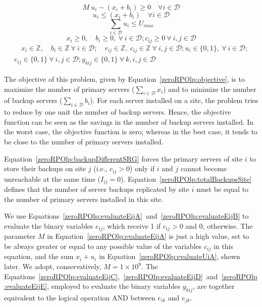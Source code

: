 \documentclass[preprint]{elsarticle}
\begin{document}
\begin{equation}
M \ u_i - (x_i + b_i) \geq 0 \quad \forall i \in \mathcal{D}
\label{zeroRPOlp:evaluateUiA}
\end{equation}
\begin{equation}
u_i \leq (x_i + b_i) \quad \forall i \in \mathcal{D}
\label{zeroRPOlp:evaluateUiB}
\end{equation}
\begin{equation}
\sum_{i \in \mathcal{D}} u_i \leq U_{max}
\label{zeroRPOlp:maxNrSites}
\end{equation}
\begin{equation}
x_i \geq 0, \quad b_i \geq 0, \ \forall \ i \in \mathcal{D} ; c_{ij} \geq 0 \ \forall \ i,j \in \mathcal{D}
\label{zeroRPOlp:boundsA}
\end{equation}
\begin{equation}
\begin{split}
\quad x_i \in \mathbb{Z}, \quad b_i \in \mathbb{Z} \ \forall \ i \in \mathcal{D}; \quad r_{ij} \in \mathbb{Z}, \ c_{ij} \in \mathbb{Z} \ \forall \ i,j \in \mathcal{D}; u_i \in \{0,1\},  \ \forall \ i \in \mathcal{D}; \\
 e_{ij} \in \{0,1\} \ \forall \ i,j \in \mathcal{D}; y_{kij} \in \{0,1\} \ \forall \ k,i,j \in \mathcal{D}
\end{split}
\label{zeroRPOlp:domain}
\end{equation}

The objective of this problem, given by Equation~\ref{zeroRPOlp:objective}, is to maximize the number of primary servers ($\sum_{i \in \mathcal{D}} x_i$) and to minimize the number of backup servers ($\sum_{i \in \mathcal{D}} b_i$). For each server installed on a site, the problem tries to reduce by one unit the number of backup servers. Hence, the objective function can be seen as the savings in the number of backup servers installed. In the worst case, the objective function is zero; whereas in the best case, it tends to be close to the number of primary servers installed.

Equation~\ref{zeroRPOlp:backupDifferentSRG} forces the primary servers of site $i$ to store their backups on site $j$ (i.e., $c_{ij} > 0$) only if $i$ and $j$ cannot become unreachable at the same time ($I_{ij} = 0$). 
Equation~\ref{zeroRPOlp:totalBackupsSite} defines that the number of server backups replicated by site $i$ must be equal to the number of primary servers installed in this site.

We use Equations~\ref{zeroRPOlp:evaluateEijA}~and~\ref{zeroRPOlp:evaluateEijB} to evaluate the binary variables $e_{ij}$, which receive 1 if $c_{ij} > 0$ and 0, otherwise. The parameter $M$ in Equation~\ref{zeroRPOlp:evaluateEijA} is just a high value, set to be always greater or equal to any possible value of the variables 
$c_{ij}$ in this equation, and the sum $x_i + u_i$ in Equation~\ref{zeroRPOlp:evaluateUiA}, shown later. We adopt, conservatively, $M=1\times10^9$.
The Equations~\ref{zeroRPOlp:evaluateEijC},~\ref{zeroRPOlp:evaluateEijD}~and~\ref{zeroRPOlp:evaluateEijE}, employed to evaluate the binary variables $y_{kij}$, are together equivalent to the logical operation AND between $e_{ik}$ and $e_{jk}$.
\end{document}
